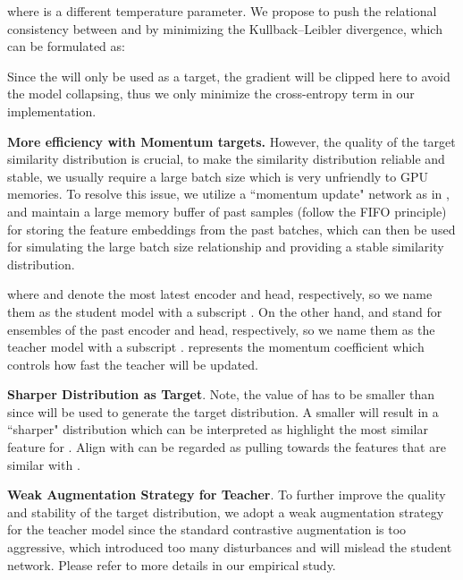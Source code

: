 \documentclass{article}
\newcommand{\<}{\left\langle}
\renewcommand{\>}{\right\rangle}
\begin{document}
where  is a different temperature parameter. We propose to push the relational consistency between  and  by minimizing the Kullback–Leibler divergence, which can be formulated as:

Since the  will only be used as a target, the gradient will be clipped here to avoid the model collapsing, thus we only minimize the cross-entropy term  in our implementation.


\textbf{More efficiency with Momentum targets.} 
However, the quality of the target similarity distribution  is crucial, to make the similarity distribution reliable and stable, we usually require a large batch size which is very unfriendly to GPU memories. To resolve this issue, we utilize a ``momentum update" network as in \cite{moco, mocov2}, and maintain a large memory buffer  of  past samples  (follow the FIFO principle) for storing the feature embeddings from the past batches, which can then be used for simulating the large batch size relationship and providing a stable similarity distribution. 

where  and  denote the most latest encoder and head, respectively, so we name them as the student model with a subscript . On the other hand,  and  stand for ensembles of the past encoder and head, respectively, so we name them as the teacher model with a subscript .  represents the momentum coefficient which controls how fast the teacher  will be updated.


























\textbf{Sharper Distribution as Target}.
 Note, the value of  has to be smaller than  since  will be used to generate the target distribution. A smaller  will result in a ``sharper" distribution which can be interpreted as highlight the most similar feature for . Align  with  can be regarded as pulling  towards the features that are similar with .

\textbf{Weak Augmentation Strategy for Teacher}.
To further improve the quality and stability of the target distribution, we adopt a weak augmentation strategy for the teacher model since the standard contrastive augmentation is too aggressive, which introduced too many disturbances and will mislead the student network. Please refer to more details in our empirical study. 
\end{document}
